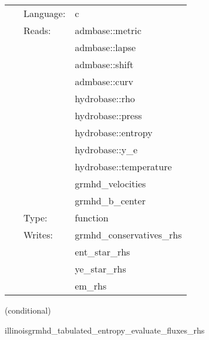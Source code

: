 \hspace{5mm}{\it entropy+tabulated version of illinoisgrmhd\_evaluate\_sources\_rhs } 


\hspace{5mm}

 \begin{tabular*}{160mm}{cll} 
~ & Language:  & c \\ 
~ & Reads:  & admbase::metric \\ 
~& ~ &admbase::lapse\\ 
~& ~ &admbase::shift\\ 
~& ~ &admbase::curv\\ 
~& ~ &hydrobase::rho\\ 
~& ~ &hydrobase::press\\ 
~& ~ &hydrobase::entropy\\ 
~& ~ &hydrobase::y\_e\\ 
~& ~ &hydrobase::temperature\\ 
~& ~ &grmhd\_velocities\\ 
~& ~ &grmhd\_b\_center\\ 
~ & Type:  & function \\ 
~ & Writes:  & grmhd\_conservatives\_rhs \\ 
~& ~ &ent\_star\_rhs\\ 
~& ~ &ye\_star\_rhs\\ 
~& ~ &em\_rhs\\ 
\end{tabular*} 


\vspace{5mm}

   (conditional) 

\hspace{5mm} illinoisgrmhd\_tabulated\_entropy\_evaluate\_fluxes\_rhs 

\hspace{5mm}{\it entropy+tabulated version of illinoisgrmhd\_evaluate\_fluxes\_rhs } 


\hspace{5mm}

